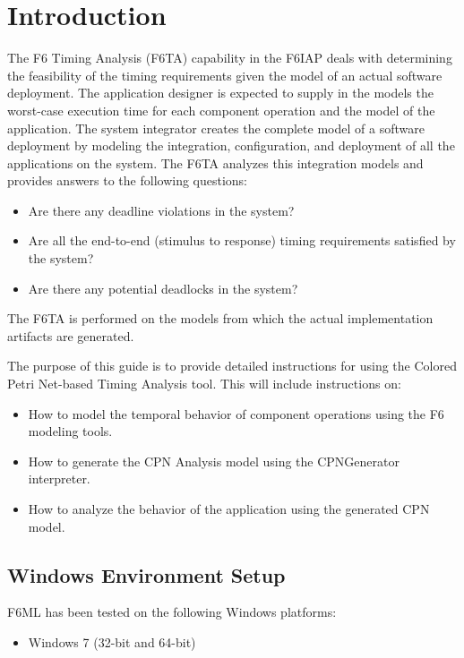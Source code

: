 \chapter{Introduction}\label{introduction}

The F6 Timing Analysis (F6TA) capability in the F6IAP deals with determining the feasibility of the timing requirements given the model of an actual software deployment. The application designer is expected to supply in the models the worst-case execution time for each component operation and the model of the application. The system integrator creates the  complete model of a software deployment by modeling the integration, configuration, and deployment of all the applications on the system. The F6TA analyzes this integration models and provides answers to the following questions:
\begin{itemize}
	\item Are there any deadline violations in the system?
	\item Are all the end-to-end (stimulus to response) timing requirements satisfied by the system?
	\item Are there any potential deadlocks in the system? 
\end{itemize}
The F6TA is performed on the models from which the actual implementation artifacts are generated. 

The purpose of this guide is to provide detailed instructions for using the Colored Petri Net-based Timing Analysis tool. This will include instructions on: 

\begin{itemize}
\item How to model the temporal behavior of component operations using the F6 modeling tools.
\item How to generate the CPN Analysis model using the CPNGenerator interpreter. 
\item How to analyze the behavior of the application using the generated CPN model.
\end{itemize}

\section{Windows Environment Setup}

F6ML has been tested on the following Windows platforms: 
\begin{itemize}
\item Windows 7 (32-bit and 64-bit)
\end{itemize}

